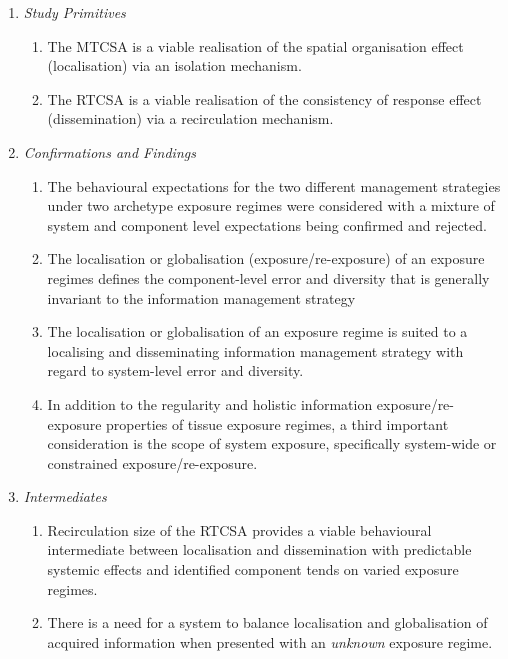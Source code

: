 \begin{enumerate}
	\item \emph{Study Primitives}
		\begin{enumerate}
			\item The MTCSA is a viable realisation of the spatial organisation effect (localisation) via an isolation mechanism.
			\item The RTCSA is a viable realisation of the consistency of response effect (dissemination) via a recirculation mechanism.
		\end{enumerate}
	
	\item \emph{Confirmations and Findings}
		\begin{enumerate}
			\item The behavioural expectations for the two different management strategies under two archetype exposure regimes were considered with a mixture of system and component level expectations being confirmed and rejected.
			\item The localisation or globalisation (exposure/re-exposure) of an exposure regimes defines the component-level error and diversity that is generally invariant to the information management strategy			
			\item The localisation or globalisation of an exposure regime is suited to a localising and disseminating information management strategy with regard to system-level error and diversity.
			\item In addition to the regularity and holistic information exposure/re-exposure properties of tissue exposure regimes, a third important consideration is the scope of system exposure, specifically system-wide or constrained exposure/re-exposure.
		\end{enumerate}	
	
	\item \emph{Intermediates}
		\begin{enumerate}
			\item Recirculation size of the RTCSA provides a viable behavioural intermediate between localisation and dissemination with predictable systemic effects and identified component tends on varied exposure regimes.
			\item There is a need for a system to balance localisation and globalisation of acquired information when presented with an \emph{unknown} exposure regime.
		\end{enumerate}		
\end{enumerate}

